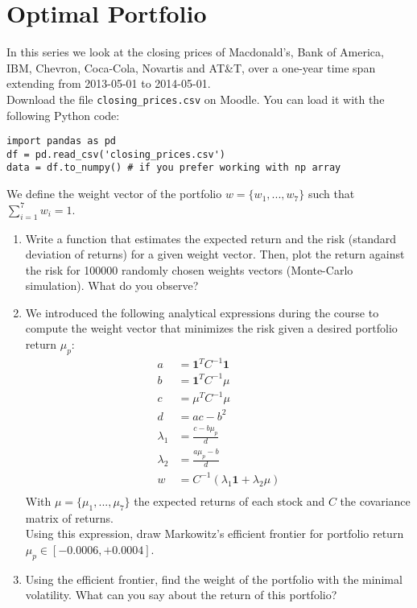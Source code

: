 \section*{Optimal Portfolio}
In this series we look at the closing prices of Macdonald's, Bank of America, IBM, Chevron, Coca-Cola, Novartis and AT\&T, over a one-year time span extending from 2013-05-01 to 2014-05-01. \\

\noindent Download the file \texttt{closing\_prices.csv} on Moodle. You can load it with the following Python code:

\begin{verbatim}
import pandas as pd
df = pd.read_csv('closing_prices.csv')
data = df.to_numpy() # if you prefer working with np array
\end{verbatim}

\noindent We define the weight vector of the portfolio $w = \{w_1, ..., w_7\}$ such that $\sum\limits_{i=1}^{7} w_i = 1$.

\begin{enumerate}
    \item Write a function that estimates the expected return and the risk (standard deviation of returns) for a given weight vector. Then, plot the return against the risk for 100000 randomly chosen weights vectors (Monte-Carlo simulation). What do you observe?
    \item We introduced the following analytical expressions during the course to compute the weight vector that minimizes the risk given a desired portfolio return $\mu_p$:
        \begin{equation}
        \begin{aligned}
            a &= \mathbf{1}^T C^{-1} \mathbf{1} \\
            b &= \mathbf{1}^T C^{-1} \mu  \\
            c &= \mu^T C^{-1} \mu  \\
            d &= ac - b^2 \\
            \lambda_1 &= \frac{c - b \mu_p}{d} \\
            \lambda_2 &= \frac{a \mu_p - b}{d} \\
            w &= C^{-1} (\lambda_1 \mathbf{1} + \lambda_2 \mu)  \\
        \end{aligned}
        \end{equation}
    With $\mu = \{\mu_1, ..., \mu_7\}$ the expected returns of each stock and $C$ the covariance matrix of returns.\\ 
        \noindent Using this expression, draw Markowitz's efficient frontier for portfolio return $\mu_p \in [-0.0006, +0.0004]$.
    \item Using the efficient frontier, find the weight of the portfolio with the minimal volatility. What can you say about the return of this portfolio?
\end{enumerate}

